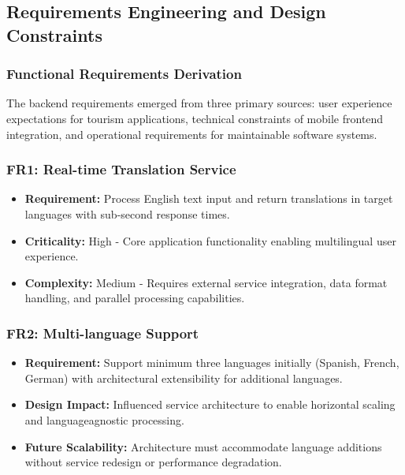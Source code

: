 \subsection{Requirements Engineering and Design Constraints}

\subsubsection{Functional Requirements Derivation}

The backend requirements emerged from three primary sources: user experience expectations
for tourism applications, technical constraints of mobile frontend integration, and operational
requirements for maintainable software systems.

\subsubsection{FR1: Real-time Translation Service}
\begin{itemize}
    \item \textbf{Requirement:} Process English text input and return translations in target languages with 
    sub-second response times.
    \item \textbf{Criticality:} High - Core application functionality enabling multilingual user experience.
    \item \textbf{Complexity:} Medium - Requires external service integration, data format handling, and
parallel processing capabilities.
\end{itemize}

\subsubsection{FR2: Multi-language Support}
\begin{itemize}
    \item \textbf{Requirement:} Support minimum three languages initially (Spanish, French, German) with
architectural extensibility for additional languages.
    \item \textbf{Design Impact:} Influenced service architecture to enable horizontal scaling and languageagnostic processing.
    \item \textbf{Future Scalability:} Architecture must accommodate language additions without service
redesign or performance degradation.
\end{itemize}

